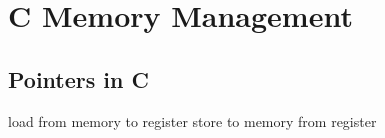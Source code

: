 \chapter{C Memory Management}
\section{Pointers in C}

load from memory to register
store to memory from register